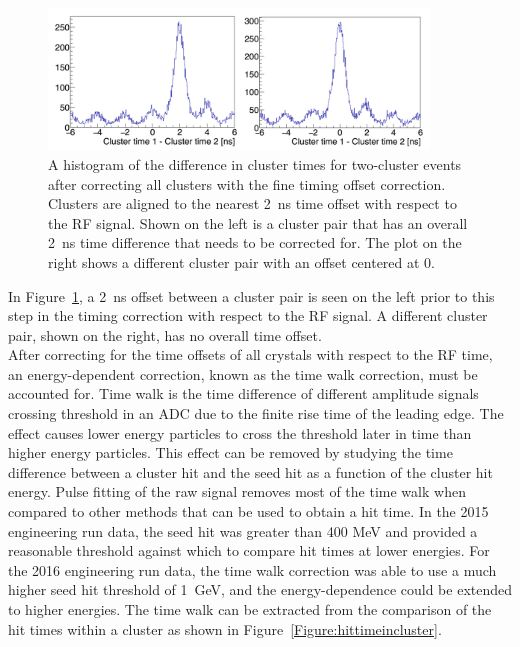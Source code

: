 \begin{figure}[htb]
  \centering
      \includegraphics[width=0.9\textwidth]{pics/performance/2clusteroffset.png}
  \caption[Time difference between two clusters after fine offset time correction]{A histogram of the difference in cluster times for two-cluster events after correcting all clusters with the fine timing offset correction. Clusters are aligned to the nearest 2~ns time offset with respect to the RF signal. Shown on the left is a cluster pair that has an overall 2~ns time difference that needs to be corrected for. The plot on the right shows a different cluster pair with an offset centered at 0.}
  \label{Figure:2clusoffset}
\end{figure}

In Figure~\ref{Figure:2clusoffset}, a 2~ns offset between a cluster pair is seen on the left prior to this step in the timing correction with respect to the RF signal. A different cluster pair, shown on the right, has no overall time offset. \\
\indent After correcting for the time offsets of all crystals with respect to the RF time, an energy-dependent correction, known as the time walk correction, must be accounted for. Time walk is the time difference of different amplitude signals crossing threshold in an ADC due to the finite rise time of the leading edge. The effect causes lower energy particles to cross the threshold later in time than higher energy particles. This effect can be removed by studying the time difference between a cluster hit and the seed hit as a function of the cluster hit energy. Pulse fitting of the raw signal removes most of the time walk when compared to other methods that can be used to obtain a hit time. In the 2015 engineering run data, the seed hit was greater than 400 MeV and provided a reasonable threshold against which to compare hit times at lower energies. For the 2016 engineering run data, the time walk correction was able to use a much higher seed hit threshold of 1~GeV, and the energy-dependence could be extended to higher energies. The time walk can be extracted from the comparison of the hit times within a cluster as shown in Figure~\ref{Figure:hittimeincluster}.

